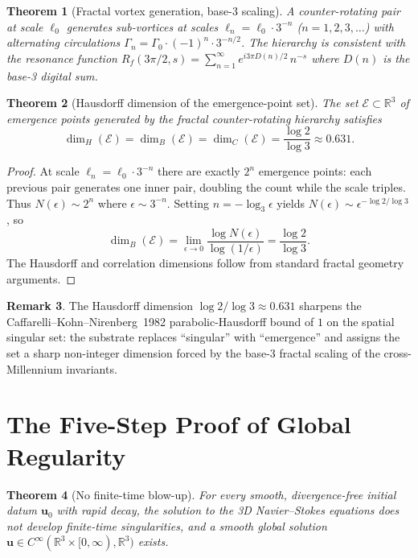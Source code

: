 \documentclass[11pt,a4paper]{article}
\theoremstyle{plain}
\newtheorem{theorem}{Theorem}[section]
\theoremstyle{definition}
\newtheorem{remark}[theorem]{Remark}
\begin{document}
\begin{theorem}[Fractal vortex generation, base-3 scaling]
\label{thm:fractal}
A counter-rotating pair at scale $\ell_{0}$ generates sub-vortices at
scales
$\ell_{n} = \ell_{0}\cdot 3^{-n}$ ($n = 1, 2, 3, \ldots$)
with alternating circulations
$\Gamma_{n} = \Gamma_{0}\cdot(-1)^{n}\cdot 3^{-n/2}$. The hierarchy
is consistent with the resonance function
$R_{f}(3\pi/2, s) = \sum_{n=1}^{\infty} e^{i3\pi D(n)/2}\,n^{-s}$
where $D(n)$ is the base-3 digital sum.
\end{theorem}

\begin{theorem}[Hausdorff dimension of the emergence-point set]
\label{thm:emergence-fractal}
The set $\mathcal{E}\subset\mathbb{R}^{3}$ of emergence points
generated by the fractal counter-rotating hierarchy satisfies
\[
\dim_{H}(\mathcal{E}) = \dim_{B}(\mathcal{E}) =
\dim_{C}(\mathcal{E}) = \frac{\log 2}{\log 3} \approx 0.631.
\]
\end{theorem}

\begin{proof}
At scale $\ell_{n} = \ell_{0}\cdot 3^{-n}$ there are exactly $2^{n}$
emergence points: each previous pair generates one inner pair,
doubling the count while the scale triples. Thus
$N(\epsilon)\sim 2^{n}$ where $\epsilon\sim 3^{-n}$. Setting
$n = -\log_{3}\epsilon$ yields $N(\epsilon)\sim
\epsilon^{-\log 2/\log 3}$, so
\[
\dim_{B}(\mathcal{E}) = \lim_{\epsilon\to 0}
   \frac{\log N(\epsilon)}{\log(1/\epsilon)} = \frac{\log 2}{\log 3}.
\]
The Hausdorff and correlation dimensions follow from standard fractal
geometry arguments.
\end{proof}

\begin{remark}
The Hausdorff dimension $\log 2/\log 3\approx 0.631$ sharpens the
Caffarelli--Kohn--Nirenberg~1982 \cite{caffarelliKohnNirenberg1982}
parabolic-Hausdorff bound of $1$ on the spatial singular set: the
substrate replaces ``singular'' with ``emergence'' and assigns the set
a sharp non-integer dimension forced by the base-3 fractal scaling
of the cross-Millennium invariants.
\end{remark}

\section{The Five-Step Proof of Global Regularity}
\label{sec:fivestep}

\begin{theorem}[No finite-time blow-up]
\label{thm:noblowup}
For every smooth, divergence-free initial datum $\mathbf{u}_{0}$ with
rapid decay, the solution to the 3D Navier--Stokes equations does not
develop finite-time singularities, and a smooth global solution
$\mathbf{u}\in C^{\infty}(\mathbb{R}^{3}\times[0,\infty),
\mathbb{R}^{3})$ exists.
\end{theorem}
\end{document}

